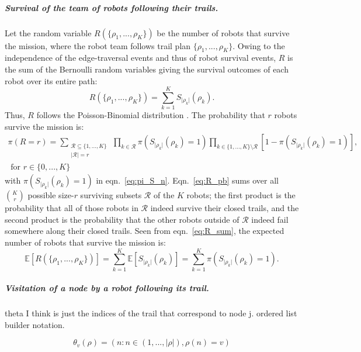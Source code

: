 \documentclass[11pt, oneside]{article}
\begin{document}
\subparagraph{Survival of the team of robots following their trails.}
Let the random variable $R(\{\rho_1, ..., \rho_K\})$ be the number of robots that survive the mission, where the robot team follows trail plan $\{\rho_1, ..., \rho_K\}$. Owing to the independence of the edge-traversal events and thus of robot survival events, $R$ is the sum of the Bernoulli random variables giving the survival outcomes of each robot over its entire path:
\begin{equation}
	R(\{\rho_1, ..., \rho_K\})=\sum_{k=1}^K S_{\lvert \rho_k \rvert}(\rho_k). \label{eq:R_sum}
\end{equation}
Thus, $R$ follows the Poisson-Binomial distribution \cite{tang2023poisson}.
The probability that $r$ robots survive the mission is:
\begin{multline}
	\pi(R=r) = \sum_{\substack{\mathcal{R} \subseteq \{1, ..., K\}  \\ \lvert \mathcal{R} \rvert = r} } \,
	\prod_{k \in \mathcal{R}} \pi(S_{\lvert \rho_k \rvert}(\rho_k) = 1)
	\prod_{k \in \{1, ..., K\} \setminus \mathcal{R}} [1- \pi(S_{\lvert \rho_k \rvert}(\rho_k) = 1)], \\ \text{ for } r \in \{0, ..., K\}
	\label{eq:R_pb}
\end{multline} with $ \pi(S_{\lvert \rho_k \rvert}(\rho_k) = 1)$ in eqn.~\ref{eq:pi_S_n}.
Eqn.~\ref{eq:R_pb} sums over all $\binom{K}{r}$ possible size-$r$ surviving subsets $\mathcal{R}$ of the $K$ robots; the first product is the probability that all of those robots in $\mathcal{R}$ indeed survive their closed trails, and the second product is the probability that the other robots outside of $\mathcal{R}$ indeed fail somewhere along their closed trails.
Seen from eqn.~\ref{eq:R_sum}, the expected number of robots that survive the mission is:
\begin{equation}
	\mathbb{E}[R(\{\rho_1, ..., \rho_K\})]=\sum_{k=1}^K \mathbb{E}[S_{\lvert \rho_k \rvert}(\rho_k)] = \sum_{k=1}^K  \pi(S_{\lvert \rho_k \rvert}(\rho_k) = 1).
\end{equation}

\subparagraph{Visitation of a node by a robot following its trail.} 

{\color{red} theta I think is just the indices of the trail that correspond to node j. ordered list builder notation.}

\begin{equation}
	\theta_v(\rho) = (n : n \in (1, ..., \lvert \rho \rvert) ,  \rho(n) = v)
\end{equation}
\end{document}

